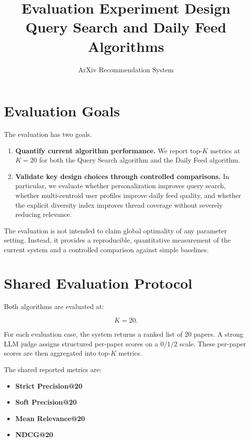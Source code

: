 \documentclass[11pt]{article}
\title{\textbf{Evaluation Experiment Design}\\
\large Query Search and Daily Feed Algorithms}
\author{ArXiv Recommendation System}
\date{}
\begin{document}
\maketitle

\section{Evaluation Goals}

The evaluation has two goals.

\begin{enumerate}[leftmargin=*]
    \item \textbf{Quantify current algorithm performance.} We report top-$K$ metrics at $K=20$ for both the Query Search algorithm and the Daily Feed algorithm.
    \item \textbf{Validate key design choices through controlled comparisons.} In particular, we evaluate whether personalization improves query search, whether multi-centroid user profiles improve daily feed quality, and whether the explicit diversity index improves thread coverage without severely reducing relevance.
\end{enumerate}

The evaluation is not intended to claim global optimality of any parameter setting. Instead, it provides a reproducible, quantitative measurement of the current system and a controlled comparison against simple baselines.

\section{Shared Evaluation Protocol}

Both algorithms are evaluated at:

\[
K = 20.
\]

For each evaluation case, the system returns a ranked list of 20 papers. A strong LLM judge assigns structured per-paper scores on a $0/1/2$ scale. These per-paper scores are then aggregated into top-$K$ metrics.

The shared reported metrics are:

\begin{itemize}[leftmargin=*]
    \item \textbf{Strict Precision@20}
    \item \textbf{Soft Precision@20}
    \item \textbf{Mean Relevance@20}
    \item \textbf{NDCG@20}
\end{itemize}
\end{document}
